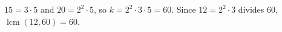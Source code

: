 $15=3\cdot5$ and $20=2^2\cdot5$, so $k=2^2\cdot3\cdot5=60$. Since $12=2^2\cdot3$ divides $60$, $\operatorname{lcm}(12,60)=\boxed{60}$.
